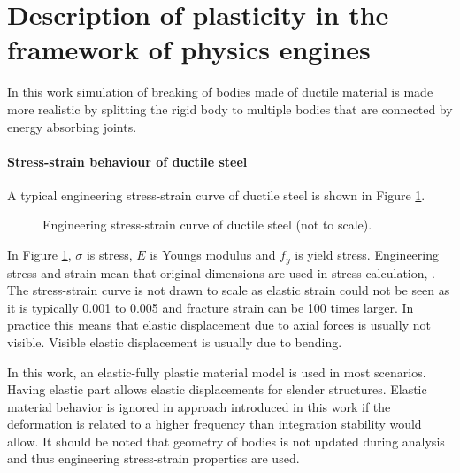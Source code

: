 \documentclass{jcgt}
\begin{document}
\section{Description of plasticity in the framework of physics engines}

In this work simulation of breaking of bodies made of ductile material is made more realistic 
by splitting the rigid body
to multiple bodies that are connected by energy absorbing joints.

\paragraph{Stress-strain behaviour of ductile steel}
A typical engineering stress-strain curve of ductile steel is shown in Figure \ref{fig:sscurve}.


\begin{figure}
\centering
{}
\caption{Engineering stress-strain curve of ductile steel (not to scale).}
\label{fig:sscurve}
\end{figure}

In Figure \ref{fig:sscurve}, $\sigma$ is stress, $E$ is Youngs modulus and $f_y$ is yield stress.
Engineering stress and strain mean that original dimensions are used in stress calculation,
\cite{dowling}.
The stress-strain curve is not drawn to scale as elastic strain could not be seen as it is typically 
0.001 to 0.005 and fracture strain can be 100 times larger.
In practice this means that elastic displacement due to axial forces is usually not visible.
Visible elastic displacement is usually due to bending.

In this work, an elastic-fully plastic material model is used in most scenarios.
Having elastic part allows elastic displacements for slender structures. 
Elastic material behavior is ignored in approach introduced in this work if
the deformation is related to a higher frequency
than integration stability would allow.
It should be noted that geometry
of bodies is not updated during analysis and thus engineering stress-strain properties are used.
\end{document}
